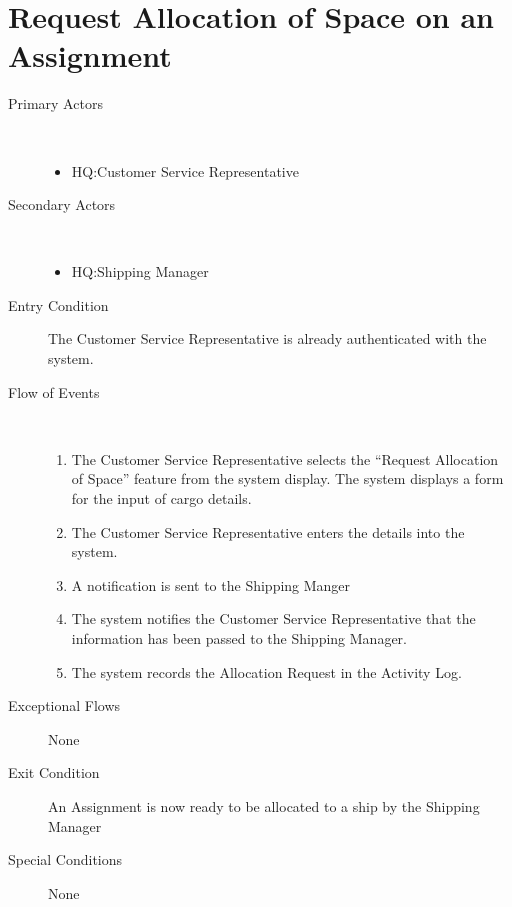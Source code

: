 \documentclass[a4paper,10pt]{report}
\begin{document}
\section{Request Allocation of Space on an Assignment}
\begin{description}
\item[Primary Actors] \
  \begin{itemize}
    \item HQ:Customer Service Representative
  \end{itemize}
\item[Secondary Actors] \
  \begin{itemize}
    \item HQ:Shipping Manager
  \end{itemize}
\item[Entry Condition]
  The Customer Service Representative is already authenticated with the system.
\item[Flow of Events] \
  \begin{enumerate}
    \item The Customer Service Representative selects the ``Request Allocation of Space'' feature from the system display. The system displays a form for the input of cargo details.
    \item The Customer Service Representative enters the details into the system.
    \item A notification is sent to the Shipping Manger
    \item The system notifies the Customer Service Representative that the information has been passed to the Shipping Manager.
    \item The system records the Allocation Request in the Activity Log.
  \end{enumerate}
\item[Exceptional Flows] None
\item[Exit Condition]
  An Assignment is now ready to be allocated to a ship by the Shipping Manager
\item[Special Conditions] None
\end{description}
\end{document}

